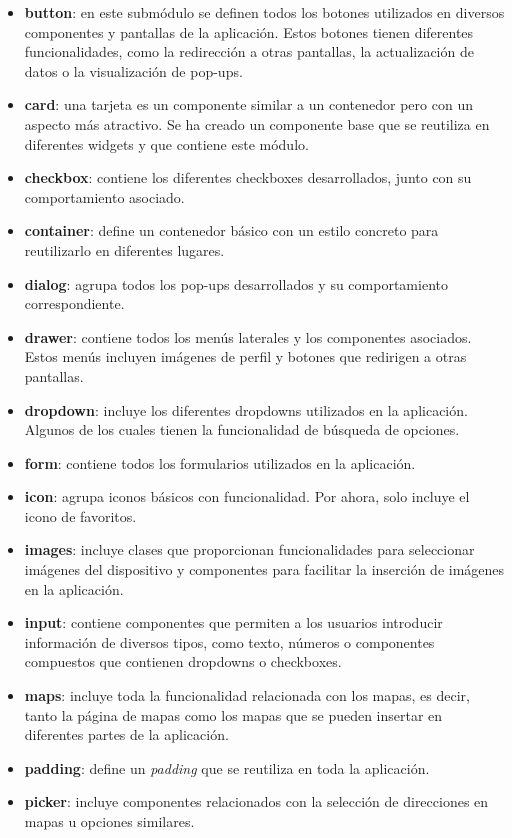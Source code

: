 \documentclass[a4paper, 12pt]{article}
\begin{document}
\begin{itemize}[noitemsep]
	\item \textbf{button}: en este submódulo se definen todos los botones utilizados en diversos componentes y pantallas de la aplicación. Estos botones tienen diferentes funcionalidades, como la redirección a otras pantallas, la actualización de datos o la visualización de pop-ups.
	\item \textbf{card}: una tarjeta es un componente similar a un contenedor pero con un aspecto más atractivo. Se ha creado un componente base que se reutiliza en diferentes widgets y que contiene este módulo.
	\item \textbf{checkbox}: contiene los diferentes checkboxes desarrollados, junto con su comportamiento asociado.
	\item \textbf{container}: define un contenedor básico con un estilo concreto para reutilizarlo en diferentes lugares.
	\item \textbf{dialog}: agrupa todos los pop-ups desarrollados y su comportamiento correspondiente.
	\item \textbf{drawer}: contiene todos los menús laterales y los componentes asociados. Estos menús incluyen imágenes de perfil y botones que redirigen a otras pantallas.
	\item \textbf{dropdown}: incluye los diferentes dropdowns utilizados en la aplicación. Algunos de los cuales tienen la funcionalidad de búsqueda de opciones.
	\item \textbf{form}: contiene todos los formularios utilizados en la aplicación.
	\item \textbf{icon}: agrupa iconos básicos con funcionalidad. Por ahora, solo incluye el icono de favoritos.
	\item \textbf{images}: incluye clases que proporcionan funcionalidades para seleccionar imágenes del dispositivo y componentes para facilitar la inserción de imágenes en la aplicación.
	\item \textbf{input}: contiene componentes que permiten a los usuarios introducir información de diversos tipos, como texto, números o componentes compuestos que contienen dropdowns o checkboxes.
	\item \textbf{maps}: incluye toda la funcionalidad relacionada con los mapas, es decir, tanto la página de mapas como los mapas que se pueden insertar en diferentes partes de la aplicación.
	\item \textbf{padding}: define un \textit{padding} que se reutiliza en toda la aplicación.
	\item \textbf{picker}: incluye componentes relacionados con la selección de direcciones en mapas u opciones similares.

\end{itemize}
\end{document}
